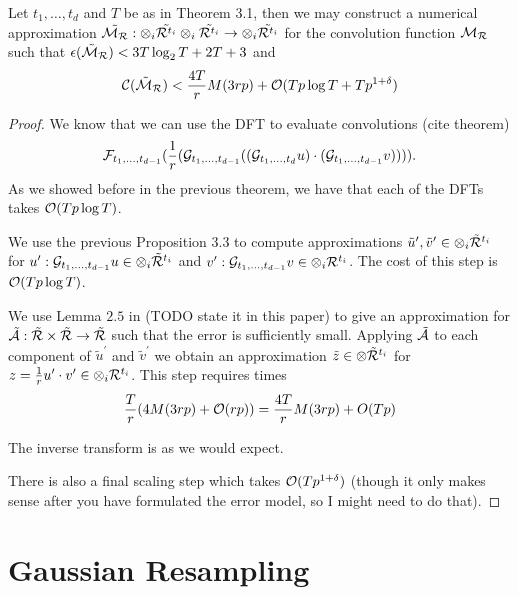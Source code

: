 \begin{proposition}
    Let $t_1, \ldots, t_d$ and $T$ be as in Theorem 3.1, then we may construct a numerical approximation $\tilde{\mathcal M_{\mathcal R}}: \otimes_i \tilde{\mathcal R^{t_i}} \otimes_i \tilde{\mathcal R^{t_i}} \to \otimes_i \tilde{\mathcal R^{t_i}}$ for the convolution function $\mathcal M_{\mathcal R}$ such that $\epsilon(\tilde{\mathcal M}_{\mathcal R}) < 3T \log_2 T + 2T + 3$ and
    \[
        \mathcal C(\tilde{\mathcal M}_{\mathcal R}) < \frac{4T}{r}M(3rp) + \mathcal O(Tp \log T + T p^{1 + \delta})
    \]
\end{proposition}

\begin{proof}
    We know that we can use the DFT to evaluate convolutions (cite theorem)
    \[
        \mathcal F_{t_1,\ldots, t_{d-1}}(\frac{1}{r}(\mathcal G_{t_1, \ldots, t_{d-1}}((\mathcal G_{t_1, \ldots, t_d}u)\cdot (\mathcal G_{t_1, \ldots, t_{d-1}} v)))).
    \]
    As we showed before in the previous theorem, we have that each of the DFTs takes $\mathcal O(Tp\log T)$.

    We use the previous Proposition 3.3 to compute approximations $\tilde{u}^\prime, \tilde{v}^\prime \in \otimes_i \tilde{\mathcal R}^{t_i}$ for $u^\prime: \mathcal G_{t_1, \ldots, t_{d-1}} u \in \otimes_i \tilde{\mathcal R}^{t_i}$ and $v^\prime: \mathcal G_{t_1, \ldots, t_{d-1}} v \in \otimes_i \mathcal R^{t_i}$. The cost of this step is $\mathcal O(Tp \log T)$.

    We use Lemma $2.5$ in \cite{nlogn} (TODO state it in this paper) to give an approximation for $\tilde{\mathcal A}: \tilde{\mathcal R} \times \tilde{\mathcal R} \to \tilde{\mathcal R}$ such that the error is sufficiently small. Applying $\tilde{\mathcal A}$ to each component of $\tilde{u}^\prime$ and $\tilde{v}^\prime$ we obtain an approximation $\tilde{z} \in \otimes \tilde{\mathcal R}^{t_i}$ for $z = \frac{1}{r}u^\prime \cdot v^\prime \in \otimes_i \mathcal R^{t_i}$. This step requires times
    \[
        \frac{T}{r}(4M(3rp) + \mathcal O(rp)) = \frac{4T}{r} M(3rp) + O(Tp)
    \]

    The inverse transform is as we would expect.

    There is also a final scaling step which takes $\mathcal O(Tp^{1 + \delta})$ (though it only makes sense after you have formulated the error model, so I might need to do that).
\end{proof}

\section{Gaussian Resampling}

